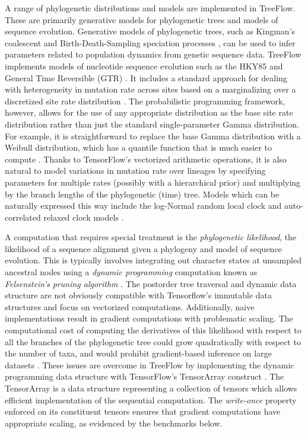 A range of phylogenetic distributions and models are implemented in TreeFlow. These are primarily generative models for phylogenetic trees and models of sequence evolution. Generative models of phylogenetic trees, such as Kingman's coalescent \cite{kuhner1995estimating} and Birth-Death-Sampling speciation processes \cite{stadler2009incomplete}, can be used to infer parameters related to population dynamics from genetic sequence data. TreeFlow implements models of nucleotide sequence evolution such as the HKY85 \cite{hasegawa1985dating} and General Time Reversible (GTR) \cite{tavare1986some}. It includes a standard approach for dealing with heterogeneity in mutation rate across sites based on a marginalizing over a discretized site rate distribution \cite{yang1994maximum}. The probabilistic programming framework, however, allows for the use of any appropriate distribution as the base site rate distribution rather than just the standard single-parameter Gamma distribution. For example, it is straightforward to replace the base Gamma distribution with a Weibull distribution, which has a quantile function that is much easier to compute \cite{fourment2019evaluating}. Thanks to TensorFlow's vectorized arithmetic operations, it is also natural to model variations in mutation rate over lineages by specifying parameters for multiple rates (possibly with a hierarchical prior) and multiplying by the branch lengths of the phylogenetic (time) tree. Models which can be naturally expressed this way include the log-Normal random local clock \cite{drummond2006relaxed} and auto-correlated relaxed clock models \cite{thorne1998estimating}.

A computation that requires special treatment is the \textit{phylogenetic likelihood}, the likelihood of a sequence alignment given a phylogeny and model of sequence evolution. This is typically involves integrating out character states at unsampled ancestral nodes using a \textit{dynamic programming} computation known as \textit{Felsenstein's pruning algorithm} \cite{felsenstein1981evolutionary}. The postorder tree traversal and dynamic data structure are not obviously compatible with Tensorflow's immutable data structures and focus on vectorized computations. Additionally, naive implementations result in gradient computations with problematic scaling. The computational cost of computing the derivatives of this likelihood with respect to all the branches of the phylogenetic tree could grow quadratically with respect to the number of taxa, and would prohibit gradient-based inference on large datasets \cite{ji2020gradients}. These issues are overcome in TreeFlow by implementing the dynamic programming data structure with TensorFlow's TensorArray construct \cite{yu2018dynamic}. The TensorArray is a data structure representing a collection of tensors which allows efficient implementation of the sequential computation. The \textit{write-once} property enforced on its constituent tensors ensures that gradient computations have appropriate scaling, as evidenced by the benchmarks below.

